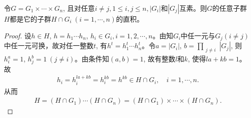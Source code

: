 \documentclass[../../main.tex]{subfiles}%
\begin{document}
\begin{example}
令$G = G_1 \times \cdots \times G_n$, 且对任意$i \neq j, 1 \leqslant i,j \leqslant n, |G_i|$和$|G_j|$互素。则$G$的任意子群$H$都是它的子群$H \cap G_i\ (i = 1, \cdots, n)$的直积。
\end{example}
\begin{proof}

设$h \in H$, $h = h_1 \cdots h_n$, $h_i \in G_i, i = 1,2,\cdots,n$。由知$G_i$中任一元与$G_j(i \neq j)$中任一元可换，故对任一整数$t$, 有$h^t = h_1^t \cdots h_n^t$。令$a = |G_i|$, $b = \prod\limits_{\substack{j \neq i}} |G_j|$, 则$h_i^a = 1$, $h_j^b = 1\ (j \neq i)$。由条件知$(a,b) = 1$, 故有整数$l$和$k$, 使得$la+kb = 1$。故
\begin{align*}
h_i = h_i^{la+kb} = h_i^{kb} = h^{kb} \in H \cap G_i, \quad i = 1, \cdots, n.
\end{align*}
从而
\begin{align*}
H = (H \cap G_1) \cdots (H \cap G_n) = (H \cap G_1) \times \cdots \times (H \cap G_n).
\end{align*}

\end{proof}
\end{document}
